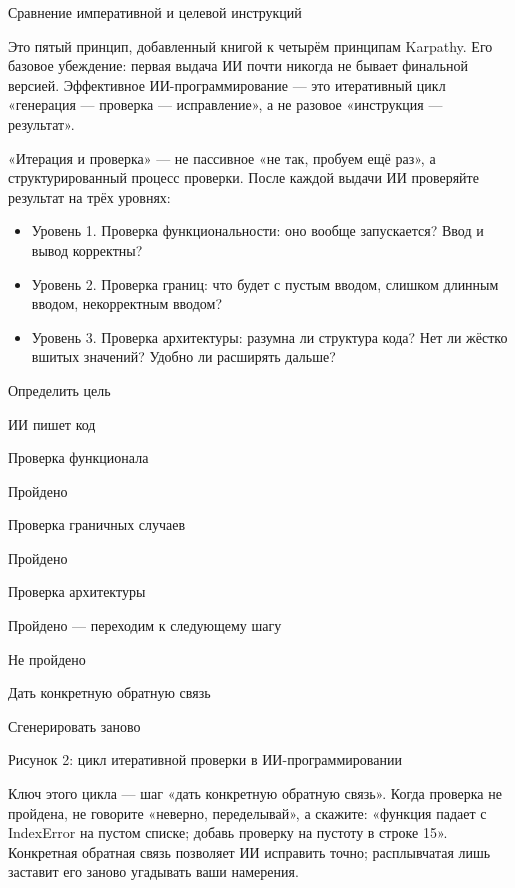 \begin{center}\small\color{gray}Сравнение императивной и целевой инструкций\end{center}


Это пятый принцип, добавленный книгой к четырём принципам Karpathy. Его базовое убеждение: первая выдача ИИ почти никогда не бывает финальной версией. Эффективное ИИ-программирование — это итеративный цикл «генерация — проверка — исправление», а не разовое «инструкция — результат».

«Итерация и проверка» — не пассивное «не так, пробуем ещё раз», а структурированный процесс проверки. После каждой выдачи ИИ проверяйте результат на трёх уровнях:

\begin{itemize}
  \item Уровень 1. Проверка функциональности: оно вообще запускается? Ввод и вывод корректны?
  \item Уровень 2. Проверка границ: что будет с пустым вводом, слишком длинным вводом, некорректным вводом?
  \item Уровень 3. Проверка архитектуры: разумна ли структура кода? Нет ли жёстко вшитых значений? Удобно ли расширять дальше?
\end{itemize}

Определить цель

ИИ пишет код

Проверка функционала

Пройдено

Проверка граничных случаев

Пройдено

Проверка архитектуры

Пройдено — переходим к следующему шагу

Не пройдено

Дать конкретную обратную связь

Сгенерировать заново

\begin{center}\small\color{gray}Рисунок 2: цикл итеративной проверки в ИИ-программировании\end{center}

Ключ этого цикла — шаг «дать конкретную обратную связь». Когда проверка не пройдена, не говорите «неверно, переделывай», а скажите: «функция падает с IndexError на пустом списке; добавь проверку на пустоту в строке 15». Конкретная обратная связь позволяет ИИ исправить точно; расплывчатая лишь заставит его заново угадывать ваши намерения.

